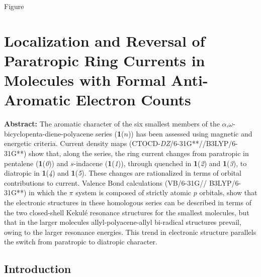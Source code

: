 Figure\chapter{Localization and Reversal of Paratropic Ring Currents in Molecules with Formal Anti-Aromatic Electron Counts}
\label{chap_indacene}


\noindent\textbf{Abstract:} The aromatic character of the six smallest members of the $\alpha$,$\omega$-bicyclopenta-diene-polyacene series (\textbf{1}($n$)) has been assessed using magnetic and energetic criteria. Current density maps (CTOCD-\textit{DZ}/6-31G**//B3LYP/6-31G**) show that, along the series, the ring current changes from paratropic in pentalene (\textbf{1}(\textit{0})) and $s$-indacene (\textbf{1}(\textit{1})), through quenched in \textbf{1}(\textit{2}) and \textbf{1}(\textit{3}), to diatropic in \textbf{1}(\textit{4}) and \textbf{1}(\textit{5}). These changes are rationalized in terms of orbital contributions to current. Valence Bond calculations (VB/\mbox{6-31G}// B3LYP/\mbox{6-31G**}) in which the $\pi$ system is composed of strictly atomic $p$ orbitals, show that the electronic structures in these homologous series can be described in terms of the two closed-shell Kekul\'e resonance structures for the smallest molecules, but that in the larger molecules allyl-polyacene-allyl bi-radical structures prevail, owing to the larger resonance energies. This trend in electronic structure parallels the switch from paratropic to diatropic character.

\newpage

\section{Introduction}

